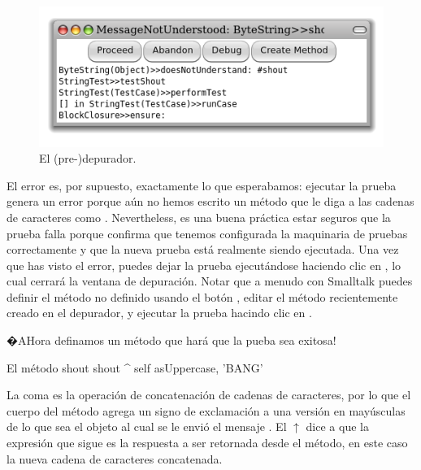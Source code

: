 \documentclass[a4paper,10pt,twoside]{book}
\begin{document}
\begin{figure}[hbt]
\centerline {\includegraphics[width=\textwidth]{Predebugger}}
\caption{El (pre-)depurador.}
\end{figure}

El error es, por supuesto, exactamente lo que esperabamos: ejecutar la prueba genera un error porque a\'un no hemos escrito un m\'etodo que le diga a las cadenas de caracteres como .  
Nevertheless, es una buena pr\'actica estar seguros que la prueba falla porque confirma que tenemos configurada la maquinaria de pruebas correctamente y que la nueva prueba est\'a realmente siendo ejecutada.
Una vez que has visto el error, puedes dejar la prueba ejecut\'andose haciendo clic en , lo cual cerrar\'a la ventana de depuraci\'on.
Notar que a menudo con Smalltalk puedes definir el m\'etodo no definido usando el bot\'on , editar el m\'etodo recientemente creado en el depurador, y ejecutar la prueba hacindo clic en .

�AHora definamos un m\'etodo que har\'a que la pueba sea exitosa!

\begin{method}[shout]{El m\'etodo shout}
shout
	^ self asUppercase, 'BANG'
\end{method}

La coma es la operaci\'on de concatenaci\'on de cadenas de caracteres, por lo que el cuerpo del m\'etodo agrega un signo de exclamaci\'on a una versi\'on en may\'usculas de lo que sea el objeto  al cual se le envi\'o el mensaje .
El $\uparrow$ dice a \pharo que la expresi\'on que sigue es la respuesta a ser retornada desde el m\'etodo, en este caso la nueva cadena de caracteres concatenada.
\end{document}
